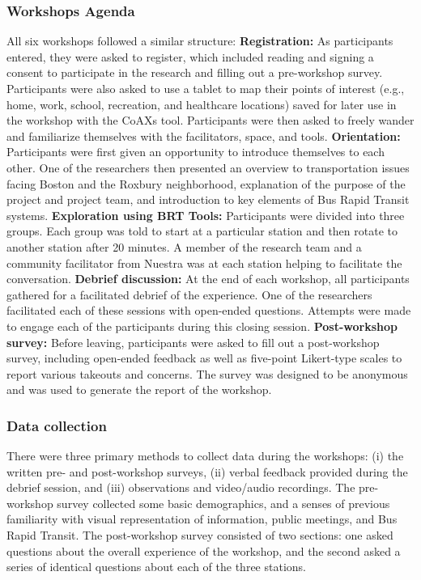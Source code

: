 {{        \subsubsection{Workshops Agenda}
        {
            All six workshops followed a similar structure:
            \newline
            \textbf{Registration:} As participants entered, they were asked to register, which included reading and signing a consent to participate in the research and filling out a pre-workshop survey. Participants were also asked to use a tablet to map their points of interest (e.g., home, work, school, recreation, and healthcare locations) saved for later use in the workshop with the CoAXs tool. Participants were then asked to freely wander and familiarize themselves with the facilitators, space, and tools.
            \newline
            \textbf{Orientation:} Participants were first given an opportunity to introduce themselves to each other. One of the researchers then presented an overview to transportation issues facing Boston and the Roxbury neighborhood, explanation of the purpose of the project and project team, and introduction to key elements of Bus Rapid Transit systems.
            \newline
            \textbf{Exploration using BRT Tools:} Participants were divided into three groups. Each group was told to start at a particular station and then rotate to another station after 20 minutes. A member of the research team and a community facilitator from Nuestra was at each station helping to facilitate the conversation.
            \newline
            \textbf{Debrief discussion:} At the end of each workshop, all participants gathered for a facilitated debrief of the experience. One of the researchers facilitated each of these sessions with open-ended questions. Attempts were made to engage each of the participants during this closing session.
            \newline
            \textbf{Post-workshop survey:} Before leaving, participants were asked to fill out a post-workshop survey, including open-ended feedback as well as five-point Likert-type scales to report various takeouts and concerns. The survey was designed to be anonymous and was used to generate the report of the workshop.
        }

        \subsubsection{Data collection}
        {
            There were three primary methods to collect data during the workshops: (i) the written pre- and post-workshop surveys, (ii) verbal feedback provided during the debrief session, and (iii) observations and video/audio recordings. The pre-workshop survey collected some basic demographics, and a senses of previous familiarity with visual representation of information, public meetings, and Bus Rapid Transit. The post-workshop survey consisted of two sections: one asked questions about the overall experience of the workshop, and the second asked a series of identical questions about each of the three stations.
        }
    }

}
